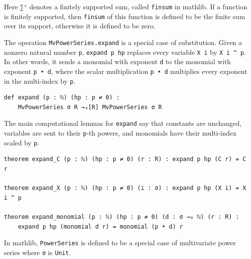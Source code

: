 Here \lstinline|∑ᶠ| denotes a finitely supported sum, called
\lstinline|finsum|
\href{https://leanprover-community.github.io/mathlib4_docs/Mathlib/Algebra/BigOperators/Finprod.html#finsum}{\faExternalLink}
in mathlib.
If a function is finitely supported, then
\lstinline|finsum| of this function is defined to be the finite sum over
its support, otherwise it is defined to be zero.

The operation \lstinline|MvPowerSeries.expand|
\href{https://leanprover-community.github.io/mathlib4_docs/Mathlib/RingTheory/MvPowerSeries/Expand.html#MvPowerSeries.expand}{\faExternalLink}
is a special case of
substitution.  Given a nonzero natural number \lstinline|p|,
\lstinline|expand p hp| replaces every variable \lstinline|X i| by
\lstinline|X i ^ p|.  In other words, it sends a monomial with exponent
\lstinline|d| to the monomial with exponent \lstinline|p • d|, where the
scalar multiplication \lstinline|p • d| multiplies every exponent in the
multi-index by \lstinline|p|.

\begin{lstlisting}
def expand (p : ℕ) (hp : p ≠ 0) :
    MvPowerSeries σ R →ₐ[R] MvPowerSeries σ R
\end{lstlisting}

The main computational lemmas for \lstinline|expand| say that constants
are unchanged, variables are sent to their \lstinline|p|-th powers, and
monomials have their multi-index scaled by \lstinline|p|.

\begin{lstlisting}
theorem expand_C (p : ℕ) (hp : p ≠ 0) (r : R) : expand p hp (C r) = C r

theorem expand_X (p : ℕ) (hp : p ≠ 0) (i : σ) : expand p hp (X i) = X i ^ p

theorem expand_monomial (p : ℕ) (hp : p ≠ 0) (d : σ →₀ ℕ) (r : R) :
    expand p hp (monomial d r) = monomial (p • d) r
\end{lstlisting}

In mathlib, \lstinline|PowerSeries|
\href{https://leanprover-community.github.io/mathlib4_docs/Mathlib/RingTheory/PowerSeries/Basic.html#PowerSeries}{\faExternalLink}
is defined to be a special case of multivariate
power series where \lstinline|σ| is \lstinline|Unit|.


